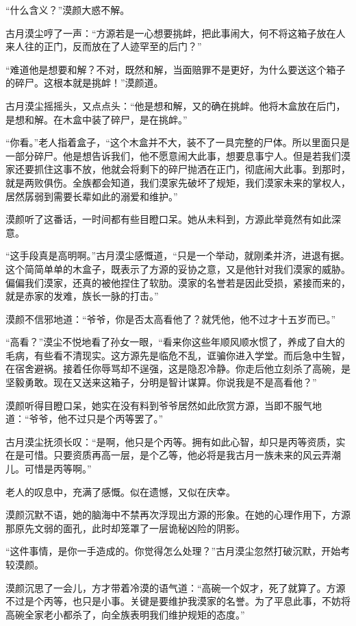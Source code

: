 \begin{this_body}
“什么含义？”漠颜大惑不解。

古月漠尘哼了一声：“方源若是一心想要挑衅，把此事闹大，何不将这箱子放在人来人往的正门，反而放在了人迹罕至的后门？”

“难道他是想要和解？不对，既然和解，当面赔罪不是更好，为什么要送这个箱子的碎尸。这根本就是挑衅！”漠颜道。

古月漠尘摇摇头，又点点头：“他是想和解，又的确在挑衅。他将木盒放在后门，是想和解。在木盒中装了碎尸，是在挑衅。”

“你看。”老人指着盒子，“这个木盒并不大，装不了一具完整的尸体。所以里面只是一部分碎尸。他是想告诉我们，他不愿意闹大此事，想要息事宁人。但是若我们漠家还要抓住这事不放，他就会将剩下的碎尸抛洒在正门，彻底闹大此事。到那时，就是两败俱伤。全族都会知道，我们漠家先破坏了规矩，我们漠家未来的掌权人，居然孱弱到需要长辈如此的溺爱和维护。”

漠颜听了这番话，一时间都有些目瞪口呆。她从未料到，方源此举竟然有如此深意。

“这手段真是高明啊。”古月漠尘感慨道，“只是一个举动，就刚柔并济，进退有据。这个简简单单的木盒子，既表示了方源的妥协之意，又是他针对我们漠家的威胁。偏偏我们漠家，还真的被他捏住了软肋。漠家的名誉若是因此受损，紧接而来的，就是赤家的发难，族长一脉的打击。”

漠颜不信邪地道：“爷爷，你是否太高看他了？就凭他，他不过才十五岁而已。”

“高看？”漠尘不悦地看了孙女一眼，“看来你这些年顺风顺水惯了，养成了自大的毛病，有些看不清现实。这方源先是临危不乱，诓骗你进入学堂。而后急中生智，在宿舍避祸。接着任你辱骂却不逞强，这是隐忍冷静。你走后他立刻杀了高碗，是坚毅勇敢。现在又送来这箱子，分明是智计谋算。你说我是不是高看他？”

漠颜听得目瞪口呆，她实在没有料到爷爷居然如此欣赏方源，当即不服气地道：“爷爷，他不过只是个丙等罢了。”

古月漠尘抚须长叹：“是啊，他只是个丙等。拥有如此心智，却只是丙等资质，实在是可惜。只要资质再高一层，是个乙等，他必将是我古月一族未来的风云弄潮儿。可惜是丙等啊。”

老人的叹息中，充满了感慨。似在遗憾，又似在庆幸。

漠颜沉默不语，她的脑海中不禁再次浮现出方源的形象。在她的心理作用下，方源那原先文弱的面孔，此时却笼罩了一层诡秘凶险的阴影。

“这件事情，是你一手造成的。你觉得怎么处理？”古月漠尘忽然打破沉默，开始考较漠颜。

漠颜沉思了一会儿，方才带着冷漠的语气道：“高碗一个奴才，死了就算了。方源不过是个丙等，也只是小事。关键是要维护我漠家的名誉。为了平息此事，不妨将高碗全家老小都杀了，向全族表明我们维护规矩的态度。”


\end{this_body}
